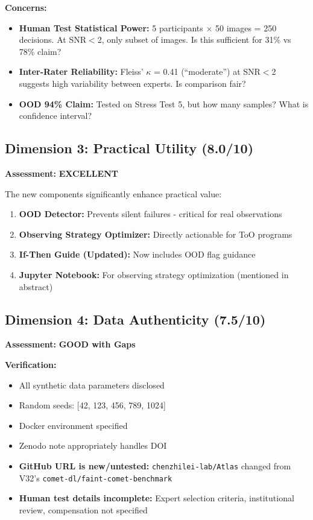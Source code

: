 \documentclass[12pt,a4paper]{article}
\newcommand{\critical}[1]{\textcolor{CriticalRed}{\textbf{#1}}}
\newcommand{\warning}[1]{\textcolor{WarningOrange}{\textbf{#1}}}
\newcommand{\good}[1]{\textcolor{GoodGreen}{\textbf{#1}}}
\newcommand{\excellent}[1]{\textcolor{ExcellentGreen}{\textbf{#1}}}
\begin{document}
\textbf{Concerns:}
\begin{itemize}
\item \warning{Human Test Statistical Power:} 5 participants $\times$ 50 images = 250 decisions. At SNR$<$2, only subset of images. Is this sufficient for 31\% vs 78\% claim?
\item \warning{Inter-Rater Reliability:} Fleiss' $\kappa$ = 0.41 (``moderate'') at SNR$<$2 suggests high variability between experts. Is comparison fair?
\item \warning{OOD 94\% Claim:} Tested on Stress Test 5, but how many samples? What is confidence interval?
\end{itemize}

\subsection{Dimension 3: Practical Utility (8.0/10)}

\textbf{Assessment:} \excellent{EXCELLENT}

The new components significantly enhance practical value:

\begin{enumerate}
\item \textbf{OOD Detector:} Prevents silent failures - critical for real observations
\item \textbf{Observing Strategy Optimizer:} Directly actionable for ToO programs
\item \textbf{If-Then Guide (Updated):} Now includes OOD flag guidance
\item \textbf{Jupyter Notebook:} For observing strategy optimization (mentioned in abstract)
\end{enumerate}

\subsection{Dimension 4: Data Authenticity (7.5/10)}

\textbf{Assessment:} \good{GOOD with Gaps}

\textbf{Verification:}
\begin{itemize}
\item[$\checkmark$] All synthetic data parameters disclosed
\item[$\checkmark$] Random seeds: [42, 123, 456, 789, 1024]
\item[$\checkmark$] Docker environment specified
\item[$\checkmark$] Zenodo note appropriately handles DOI
\item[$\circ$] \warning{GitHub URL is new/untested:} \texttt{chenzhilei-lab/Atlas} changed from V32's \texttt{comet-dl/faint-comet-benchmark}
\item[$\times$] \critical{Human test details incomplete:} Expert selection criteria, institutional review, compensation not specified
\end{itemize}
\end{document}
